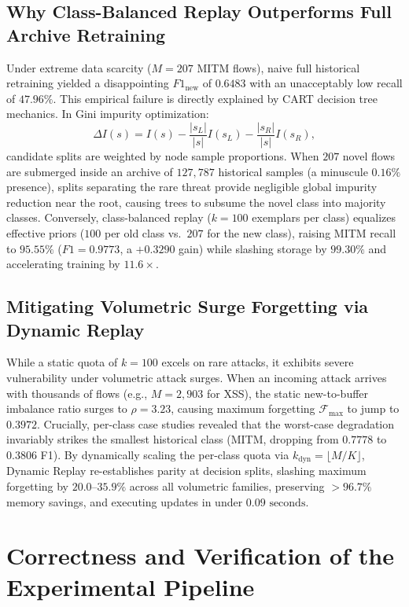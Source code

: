 \subsection{Why Class-Balanced Replay Outperforms Full Archive Retraining}
Under extreme data scarcity ($M = 207$ MITM flows), naive full historical retraining yielded a disappointing $F1_{\text{new}}$ of $0.6483$ with an unacceptably low recall of $47.96\%$. This empirical failure is directly explained by CART decision tree mechanics. In Gini impurity optimization:
\begin{equation}
\Delta I(s) = I(s) - \frac{|s_L|}{|s|}I(s_L) - \frac{|s_R|}{|s|}I(s_R),
\end{equation}
candidate splits are weighted by node sample proportions. When $207$ novel flows are submerged inside an archive of $127{,}787$ historical samples (a minuscule $0.16\%$ presence), splits separating the rare threat provide negligible global impurity reduction near the root, causing trees to subsume the novel class into majority classes. Conversely, class-balanced replay ($k = 100$ exemplars per class) equalizes effective priors ($100$ per old class vs.\ $207$ for the new class), raising MITM recall to $95.55\%$ ($F1 = 0.9773$, a $+0.3290$ gain) while slashing storage by $99.30\%$ and accelerating training by $11.6\times$.

\subsection{Mitigating Volumetric Surge Forgetting via Dynamic Replay}
While a static quota of $k = 100$ excels on rare attacks, it exhibits severe vulnerability under volumetric attack surges. When an incoming attack arrives with thousands of flows (e.g., $M = 2{,}903$ for XSS), the static new-to-buffer imbalance ratio surges to $\rho = 3.23$, causing maximum forgetting $\mathcal{F}_{\max}$ to jump to $0.3972$. Crucially, per-class case studies revealed that the worst-case degradation invariably strikes the smallest historical class (MITM, dropping from $0.7778$ to $0.3806$ F1). By dynamically scaling the per-class quota via $k_{\text{dyn}} = \lfloor M/K \rfloor$, Dynamic Replay re-establishes parity at decision splits, slashing maximum forgetting by $20.0\text{--}35.9\%$ across all volumetric families, preserving $>96.7\%$ memory savings, and executing updates in under $0.09\text{ seconds}$.

\section{Correctness and Verification of the Experimental Pipeline}
\label{sec:verification}

